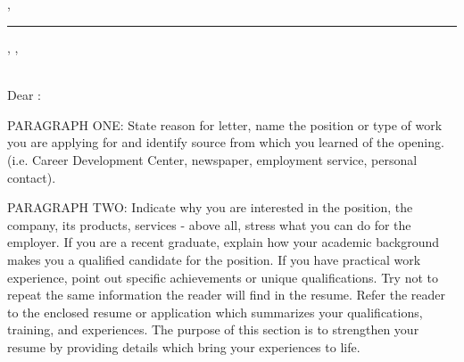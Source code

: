 \documentclass{letter} %
\begin{document}



\signature{ \userSignatureVar{} }
\longindentation=0pt
\let\raggedleft\raggedright

 
\begin{letter}{
	\recepientSalVar{} \recepientFullNameVar{} \\
	\recepientTitleVar{} \\
	\recepientAddressOneVar{} \\
	\recepientAddressTwoVar{} \\
	\recepientAddressCityVar{}, \recepientAddressStateVar{} \recepientAddressZipVar{}
}

\begin{flushleft}
{\large\bf \userSignatureVar{} }
\end{flushleft}
\medskip\hrule height 1pt
\begin{flushright}
\hfill \userAddressOneVar{} \userAddressTwoVar{}, \userAddressCityVar{}, \userAddressStateVar{} \userAddressZipVar{} \\
\hfill \userPhoneVar{} \\
\hfill \userEmailVar{}
\end{flushright} 
\vfill %

 
\opening{Dear \recepientSalVar{} \recepientLastNameVar{}:} 
 
\noindent PARAGRAPH ONE: State reason for letter, name the position or type 
of work you are applying for and identify source from  which  you 
learned   of   the  opening.  (i.e.  Career  Development  Center, 
newspaper, employment service, personal contact). 
 
\noindent PARAGRAPH  TWO:  Indicate why you are interested in the position, 
the company, its products, services - above all, stress what  you 
can  do  for  the employer. If you are a recent graduate, explain 
how your academic background makes you a qualified candidate  for 
the  position.  If  you have practical work experience, point out 
specific achievements or unique qualifications. Try not to repeat 
the  same  information  the reader will find in the resume. Refer 
the reader to the enclosed resume or application which summarizes 
your  qualifications,  training,  and experiences. The purpose of 
this section is to strengthen your resume  by  providing  details 
which bring your experiences to life. 
 

\end{letter}
\end{document}
